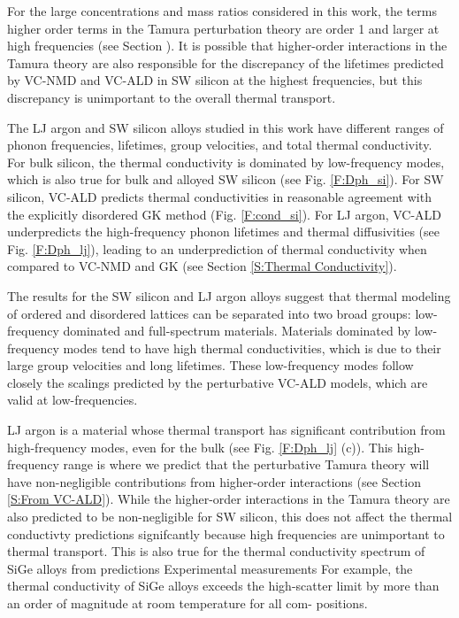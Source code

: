 \documentclass[aps,prb,onecolumn,preprint,superscriptaddress,amsmath,amssymb,floatfix]{revtex4}
\begin{document}
For the large concentrations and mass ratios considered 
in this work, the terms higher order terms in the Tamura perturbation 
theory are order 1 and larger at high 
frequencies (see Section ).\cite{tamura_isotope_1983} 
It is possible that 
higher-order interactions in the Tamura theory 
are also responsible for the 
discrepancy of the lifetimes predicted by VC-NMD and VC-ALD in SW silicon 
at the highest frequencies, 
but this discrepancy is unimportant to the overall
thermal transport.

The LJ argon and SW silicon alloys studied in this work 
have different ranges of phonon frequencies, 
lifetimes, group velocities, and total thermal conductivity. 
For bulk silicon, the thermal conductivity is dominated 
by low-frequency modes,\cite{abeles_lattice_1963,cahill_thermal_2004,
cahill_thermal_2005,garg_role_2011} which is also true for 
bulk and alloyed SW silicon (see Fig. \ref{F:Dph_si}). For SW silicon, 
VC-ALD predicts thermal conductivities in reasonable  
agreement with the 
explicitly disordered GK method (Fig. \ref{F:cond_si}).  
For LJ argon, VC-ALD underpredicts 
the high-frequency phonon lifetimes and thermal diffusivities 
(see Fig. \ref{F:Dph_lj}), 
leading to an underprediction of 
thermal conductivity when compared to VC-NMD and GK 
(see Section \ref{S:Thermal Conductivity}). 

The results for the SW silicon and LJ argon alloys suggest that 
thermal modeling of ordered and 
disordered lattices can be separated into two broad groups: 
low-frequency dominated and full-spectrum materials.  
Materials dominated 
by low-frequency modes tend to have high thermal conductivities, 
which is due to their large group velocities and long lifetimes.
\cite{abeles_thermal_1962,cahill_thermal_2004,
cahill_thermal_2005,cheaito_experimental_2012} 
These low-frequency modes  
follow closely the scalings predicted by the perturbative VC-ALD 
models, which are valid at low-frequencies. 

LJ argon is a material whose thermal transport has significant 
contribution from high-frequency modes, even for the bulk 
(see Fig. \ref{F:Dph_lj} (c)). 
This high-frequency range is where we predict that the 
perturbative Tamura theory 
will have non-negligible contributions from higher-order 
interactions (see Section \ref{S:From VC-ALD}). 
While the higher-order interactions in the 
Tamura theory are also predicted to be 
non-negligible for SW silicon, this does not affect the thermal 
conductivty predictions signifcantly because high frequencies 
are unimportant to thermal transport. This is also 
true for the thermal conductivity spectrum of SiGe alloys 
from predictions
\cite{abeles_thermal_1962,garg_role_2011,ward_intrinsic_2010} 
Experimental measurements \cite{cahill_thermal_2004,
cahill_thermal_2005,cheaito_experimental_2012} 
For example, the thermal conductivity of SiGe alloys
exceeds the high-scatter limit by more than
an order of magnitude at room temperature for all com-
positions.\cite{cahill_lattice_1988,cahill_thermal_2004,
cahill_thermal_2005}
\end{document}
